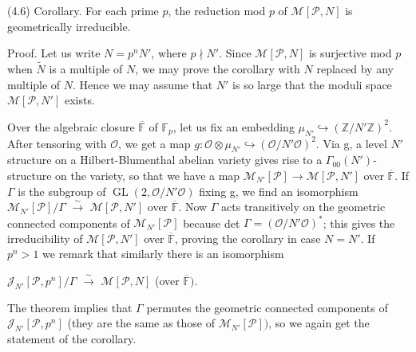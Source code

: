 \documentclass[11pt]{article}
\begin{document}
\par
(4.6) Corollary. For each prime \(p\), the reduction mod \(p\) of \(\mathcal{M}[\mathcal{P},N]\) is geometrically irreducible.\par
\par
Proof. Let us write \(N=p^{n}N'\), where \(p\nmid N'\). Since \(\mathcal{M}[\mathcal{P},N]\) is surjective mod \(p\) when \(\widetilde{N}\) is a multiple of \(N\), we may prove the corollary with \(N\) replaced by any multiple of \(N\). Hence we may assume that \(N'\) is so large that the moduli space \(\mathcal{M}[\mathcal{P},N']\) exists.\par
\par
Over the algebraic closure \(\overline{\mathbb{F}}\) of \(\mathbb{F}_{p}\), let us fix an embedding \(\mu _{N'}\hookrightarrow (\mathbb{Z}/N'\mathbb{Z})^{2}\). After tensoring with \(\mathcal{O}\), we get a map \(g:\mathcal{O}\otimes \mu _{N'}\hookrightarrow (\mathcal{O}/N'\mathcal{O})^{2}\). Via g, a level \(N'\) structure on a Hilbert-Blumenthal abelian variety gives rise to a \(\Gamma _{00}(N')\)-structure on the variety, so that we have a map \(\mathcal{M}_{N'}[\mathcal{P}]\to \mathcal{M}[\mathcal{P},N']\) over \(\overline{\mathbb{F}}\). If \(\Gamma \) is the subgroup of \(\operatorname{GL}(2,\mathcal{O}/N'\mathcal{O})\) fixing g, we find an isomorphism \(\mathcal{M}_{N'}[\mathcal{P}]/\Gamma \) \(\xrightarrow{\sim}\) \(\mathcal{M}[\mathcal{P},N']\) over \(\overline{\mathbb{F}}\). Now \(\Gamma \) acts transitively on the geometric connected components of \(\mathcal{M}_{N'}[\mathcal{P}]\) because det \(\Gamma =(\mathcal{O}/N'\mathcal{O})^{\ast}\); this gives the irreducibility of \(\mathcal{M}[\mathcal{P},N']\) over \(\overline{\mathbb{F}}\), proving the corollary in case \(N=N'\). If \(p^{n}>1\) we remark that similarly there is an isomorphism\par
\par
\(\mathcal{J}_{N'}[\mathcal{P},p^{n}]/\Gamma \) \(\xrightarrow{\sim}\) \(\mathcal{M}[\mathcal{P},N]\)    (over \(\overline{\mathbb{F}})\).\par
\par
The theorem implies that \(\Gamma \) permutes the geometric connected components of \(\mathcal{J}_{N'}[\mathcal{P},p^{n}]\) (they are the same as those of \(\mathcal{M}_{N'}[\mathcal{P}])\), so we again get the statement of the corollary.\par
\par
\end{document}
